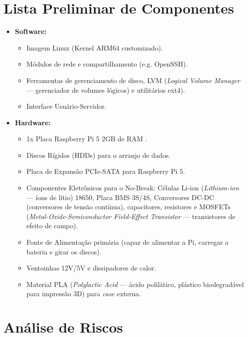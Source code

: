 \documentclass[a4paper,12pt]{article}
\begin{document}
\section{Lista Preliminar de Componentes}  
\begin{itemize}  
    \item \textbf{Software:}  
    \begin{itemize}  
        \item Imagem Linux (Kernel ARM64 customizado).
        \item Módulos de rede e compartilhamento (e.g. OpenSSH).
        \item Ferramentas de gerenciamento de disco, LVM (\textit{Logical Volume Manager} --- gerenciador de volumes lógicos) e utilitários ext4).
        \item Interface Usuário-Servidor.
    \end{itemize}  
    \item \textbf{Hardware:}  
    \begin{itemize}  
        \item 1x Placa Raspberry Pi 5 2GB de RAM .
        \item Discos Rígidos (HDDs) para o arranjo de dados.
        \item Placa de Expansão PCIe-SATA para Raspberry Pi 5.
        \item Componentes Eletrônicos para o No-Break: Células Li-ion (\textit{Lithium-ion} --- íons de lítio) 18650, Placa BMS 3S/4S, Conversores DC-DC (conversores de tensão contínua), capacitores, resistores e MOSFETs (\textit{Metal-Oxide-Semiconductor Field-Effect Transistor} --- transistores de efeito de campo).
        \item Fonte de Alimentação primária (capaz de alimentar a Pi, carregar a bateria e girar os discos).
        \item Ventoinhas 12V/5V e dissipadores de calor.
        \item Material PLA (\textit{Polylactic Acid} --- ácido polilático, plástico biodegradável para impressão 3D) para \textit{case} externa.
    \end{itemize}  
\end{itemize}  


\section{Análise de Riscos}

\renewcommand{\arraystretch}{1.4}
\end{document}
